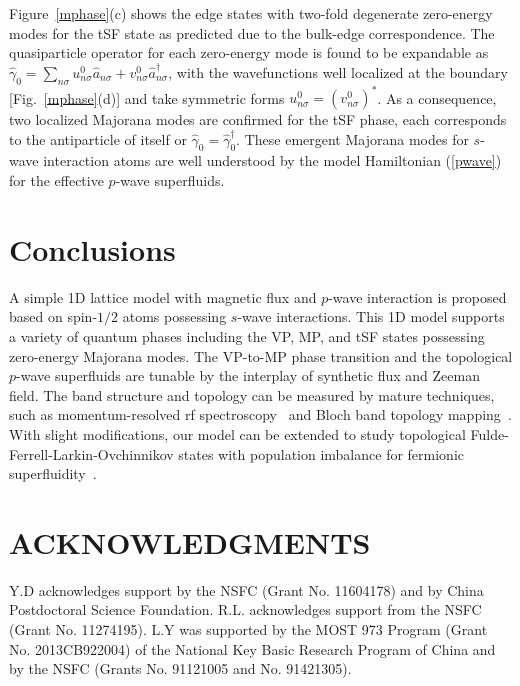 \documentclass[twocolumn,prl,superscriptaddress,amsmath,amssymb]{revtex4} %
\begin{document}
Figure~\ref{mphase}(c) shows the edge states with two-fold degenerate zero-energy modes for the tSF state as predicted due to the bulk-edge correspondence. The quasiparticle operator for each zero-energy mode is found to be expandable as $\hat{\gamma}_0=\sum_{n\sigma}u^0_{n\sigma}\hat{a}_{n\sigma} +v^0_{n\sigma}\hat{a}_{n\sigma}^\dag$, with the wavefunctions
well localized at the boundary [Fig.~\ref{mphase}(d)] and take symmetric forms $u^0_{n\sigma}= (v^0_{n\sigma})^*$. As a consequence, two localized Majorana modes are confirmed for the tSF phase, each corresponds to the antiparticle of itself or $\hat{\gamma}_0=\hat{\gamma}_0^\dag$. These emergent Majorana modes for $s$-wave interaction atoms are well understood by the model Hamiltonian (\ref{pwave}) for the effective $p$-wave superfluids.

\section{Conclusions}\label{cons}
A simple 1D lattice model with magnetic flux and $p$-wave interaction is proposed based on spin-$1/2$ atoms possessing $s$-wave interactions. This 1D model supports a variety of quantum phases including the VP, MP, and tSF states
possessing zero-energy Majorana modes. The VP-to-MP phase transition and the topological $p$-wave superfluids are tunable by the interplay of synthetic flux and Zeeman field. The band structure and topology can be measured by mature techniques, such as momentum-resolved rf spectroscopy~\cite{Stewart08} and Bloch band topology mapping~\cite{Duca15,Aidelsburger15}. With slight modifications, our model can be extended to study topological Fulde-Ferrell-Larkin-Ovchinnikov states with population imbalance for fermionic superfluidity~\cite{Liao2010}.

\section*{ACKNOWLEDGMENTS}
Y.D acknowledges support by the NSFC (Grant No. 11604178) and by China Postdoctoral Science Foundation. R.L. acknowledges support from the NSFC (Grant No. 11274195). L.Y was supported by the MOST 973 Program (Grant No. 2013CB922004) of the National Key Basic Research Program of China and by the NSFC (Grants No. 91121005 and No. 91421305).
\end{document}
